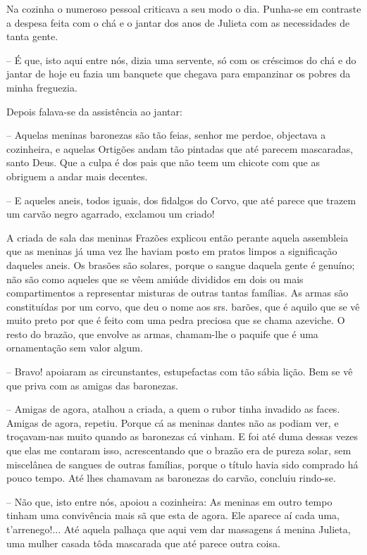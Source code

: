 \documentclass[9pt]{article}
\begin{document}
Na cozinha o numeroso pessoal criticava a seu modo o dia. Pu\-\mbox{nha-se}
em contraste a despesa feita com o chá e o jantar dos anos de Julieta
com as necessidades de tanta gente.

-- É que, isto aqui entre nós, dizia uma servente, só com os créscimos
do chá e do jantar de hoje eu fazia um banquete que chegava para empanzinar os pobres da minha freguezia.

Depois falava-se da assistência ao jantar:

-- Aquelas meninas baronezas são tão feias, senhor me perdoe, objectava a cozinheira, e aquelas Ortigões andam tão pintadas que até parecem
mascaradas, santo Deus. Que a culpa é dos pais que não teem um chicote
com que as obriguem a andar mais decentes.

-- E aqueles aneis, todos iguais, dos fidalgos do Corvo, que até parece que trazem um carvão negro agarrado, exclamou um criado!

A criada de sala das meninas Frazões explicou então perante aquela
assembleia que as meninas já uma vez lhe haviam posto em pratos limpos
a signifi\-ca\-ção daqueles aneis. Os brasões são solares, porque o sangue
daquela gente é genuíno; não são como aqueles que se vêem amiúde divididos
em dois ou mais compartimentos a representar misturas de outras tantas
fa\-mí\-lias. As armas são constituídas por um corvo, que deu o nome aos srs.
barões, que é aquilo que se vê muito preto por que é feito com uma pedra
preciosa que se chama azeviche. O resto do brazão, que envolve as armas,
chamam-\-lhe o paquife que é uma ornamenta\-ção sem valor algum.

-- Bravo! apoiaram as circunstantes, estupefactas com tão sábia li\-ção. Bem se vê que priva com as amigas das baronezas.

-- Amigas de agora, ata\-lhou a criada, a quem o rubor tinha invadido as
faces. Amigas de agora, repetiu. Porque cá as meninas dantes não as podiam ver, e troçavam-nas muito quan\-do as baronezas cá vinham. E foi até
duma dessas vezes que elas me contaram isso, acrescentando que o brazão
era de pureza solar, sem miscelânea de sangues de outras fa\-mí\-lias, porque
o título havia sido comprado há pouco tempo. Até lhes chamavam as baronezas do carvão, concluiu rindo-se.

-- Não que, isto entre nós, apoiou a cozinheira: As meninas em outro
tempo tinham uma convivência mais sã que esta de agora. Ele aparece aí
cada uma, t'arrenego!... Até aquela pa\-lhaça que aqui vem dar massagens á
menina Julieta, uma mu\-lher casada tôda mascarada que até parece outra coisa.
\end{document}
